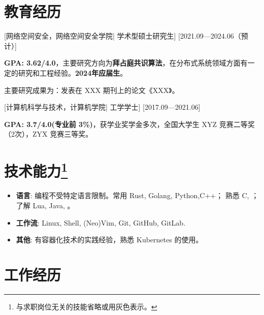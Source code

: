 \documentclass{resume}
\begin{document}


\ResumeTitle


\section{教育经历}
[\textnormal{网络空间安全，网络空间安全学院|}  学术型硕士研究生]
[2021.09—2024.06（预计）]

\textbf{GPA: 3.62/4.0}，主要研究方向为\textbf{拜占庭共识算法}，在分布式系统领域方面有一定的研究和工程经验。\textbf{2024年应届生}。

主要研究成果为：发表在 XXX 期刊上的论文《XXX》。

[\textnormal{计算机科学与技术，计算机学院|} 工学学士]
[2017.09—2021.06]

\textbf{GPA: 3.7/4.0(专业前 3\%)}，获学业奖学金多次，全国大学生 XYZ 竞赛二等奖（2次），ZYX 竞赛三等奖。

\section[技术能力]{技术能力\protect\footnote{与求职岗位无关的技能省略或用灰色表示。}}
\begin{itemize}
  \item \textbf{语言}: 编程不受特定语言限制。常用 Rust, Golang, Python,C++； 熟悉 C, ；了解 Lua, Java, 。
  \item \textbf{工作流}: Linux, Shell, (Neo)Vim, Git, GitHub, GitLab.
  \item \textbf{其他}: 有容器化技术的实践经验，熟悉 Kubernetes 的使用。
\end{itemize}

\section{工作经历}
\end{document}
